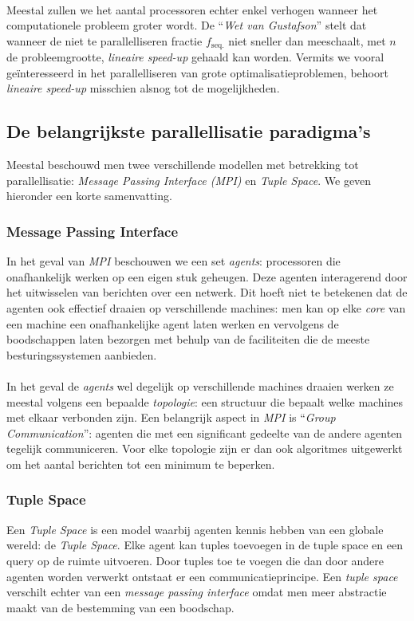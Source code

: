 \paragraph{}
Meestal zullen we het aantal processoren echter enkel verhogen wanneer het computationele probleem groter wordt. De ``\emph{Wet van Gustafson}''\cite{Gustafson:1988:RAL:42411.42415} stelt dat wanneer de niet te parallelliseren fractie $f_{\mbox{seq.}}$ niet sneller dan  meeschaalt, met $n$ de probleemgrootte, \emph{lineaire speed-up} gehaald kan worden. Vermits we vooral ge\"interesseerd in het parallelliseren van grote optimalisatieproblemen, behoort \emph{lineaire speed-up} misschien alsnog tot de mogelijkheden.

\subsection{De belangrijkste parallellisatie paradigma's}

Meestal beschouwd men twee verschillende modellen met betrekking tot parallellisatie: \emph{Message Passing Interface (MPI)} en \emph{Tuple Space}. We geven hieronder een korte samenvatting.

\subsubsection{Message Passing Interface}

In het geval van \emph{MPI} beschouwen we een set \emph{agents}: processoren die onafhankelijk werken op een eigen stuk geheugen. Deze agenten interagerend door het uitwisselen van berichten over een netwerk. Dit hoeft niet te betekenen dat de agenten ook effectief draaien op verschillende machines: men kan op elke \emph{core} van een machine een onafhankelijke agent laten werken en vervolgens de boodschappen laten bezorgen met behulp van de faciliteiten die de meeste besturingssystemen aanbieden.

\paragraph{}
In het geval de \emph{agents} wel degelijk op verschillende machines draaien werken ze meestal volgens een bepaalde \emph{topologie}: een structuur die bepaalt welke machines met elkaar verbonden zijn. Een belangrijk aspect in \emph{MPI} is ``\emph{Group Communication}'': agenten die met een significant gedeelte van de andere agenten tegelijk communiceren. Voor elke topologie zijn er dan ook algoritmes uitgewerkt om het aantal berichten tot een minimum te beperken.

\subsubsection{Tuple Space}

Een \emph{Tuple Space} is een model waarbij agenten kennis hebben van een globale wereld: de \emph{Tuple Space}. Elke agent kan tuples toevoegen in de tuple space en een query op de ruimte uitvoeren. Door tuples toe te voegen die dan door andere agenten worden verwerkt ontstaat er een communicatieprincipe. Een \emph{tuple space} verschilt echter van een \emph{message passing interface} omdat men meer abstractie maakt van de bestemming van een boodschap.